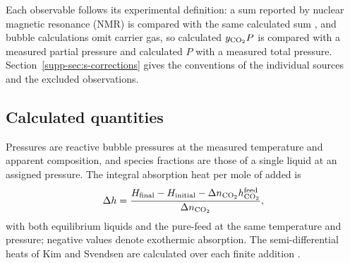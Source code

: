 Each observable follows its experimental definition: a sum reported by nuclear magnetic resonance (NMR) is compared with the same calculated sum \cite{Bottinger2008}, and bubble calculations omit carrier gas, so calculated $y_{\COtwo}P$ is compared with a measured \COtwo partial pressure and calculated $P$ with a measured total pressure.
Section~\ref{supp-sec:s-corrections} gives the conventions of the individual sources and the excluded observations.

\subsection{Calculated quantities}\label{sec:heat-method}
Pressures are reactive bubble pressures at the measured temperature and apparent composition, and species fractions are those of a single liquid at an assigned pressure.
The integral absorption heat per mole of added \COtwo is
\begin{equation}
 \Delta h=\frac{H_{\mathrm{final}}-H_{\mathrm{initial}}-\Delta n_{\COtwo}h_{\COtwo}^{\mathrm{feed}}}{\Delta n_{\COtwo}},
 \label{eq:addition-heat}
\end{equation}
with both equilibrium liquids and the pure-\COtwo feed at the same temperature and pressure; negative values denote exothermic absorption.
The semi-differential heats of Kim and Svendsen are calculated over each finite addition \cite{Kim2007}.

